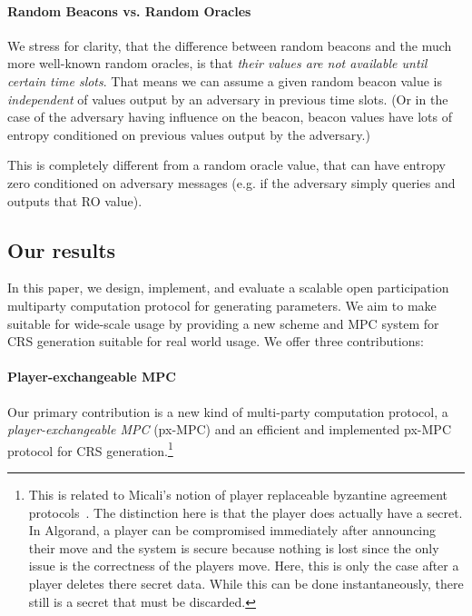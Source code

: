 \documentclass{article}
\begin{document}
\paragraph*{Random Beacons vs. Random Oracles}
We stress for clarity, that the difference between random beacons and the much more well-known random oracles,
is that \emph{their values are not available until certain time slots}.
That means we can assume a given random beacon value is \emph{independent} of values output by an adversary in previous time slots.
(Or in the case of the adversary having influence on the beacon,  beacon values have lots of entropy conditioned on previous values output by the adversary.)

This is completely different from a random oracle value, that can have entropy zero conditioned on adversary messages (e.g. if the adversary simply queries and outputs that RO value).

\subsection{Our results}

In this paper, we design, implement, and evaluate  a scalable open participation multiparty computation protocol for generating {\snark} parameters. We aim to make {\snarks} suitable for wide-scale usage by providing a new  {\snarks} scheme and MPC system for CRS generation suitable for real world usage.  We offer three contributions:


\paragraph*{Player-exchangeable MPC} Our primary contribution is a  new kind of multi-party computation protocol, a \emph{player-exchangeable MPC} (px-MPC) and an efficient and implemented px-MPC protocol for CRS generation.\footnote{This is related to Micali's notion of player replaceable byzantine agreement protocols~\cite{algorand}. The distinction here is that the player does actually have a secret. In Algorand, a player can be compromised immediately after announcing their move and the system is secure because nothing is lost since the only issue is the correctness of the players move.  Here, this is only the case after a player deletes there secret data. While this can be done instantaneously, there still is a secret that must be discarded. }
\end{document}
